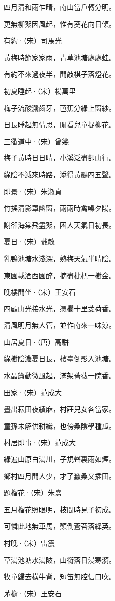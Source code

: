 \documentclass[12pt,a4paper]{ctexbook}
\begin{document}
四月清和雨乍晴，南山當戶轉分明。\par
更無柳絮因風起，惟有葵花向日傾。\par
有約·（宋）司馬光\par
黃梅時節家家雨，青草池塘處處蛙。\par
有約不來過夜半，閒敲棋子落燈花。\par
初夏睡起·（宋）楊萬里\par
梅子流酸濺齒牙，芭蕉分綠上窗紗。\par
日長睡起無情思，閒看兒童捉柳花。\par
三衢道中·（宋）曾幾\par
梅子黃時日日晴，小溪泛盡卻山行。\par
綠陰不減來時路，添得黃鸝四五聲。\par
即景·（宋）朱淑貞\par
竹搖清影罩幽窗，兩兩時禽噪夕陽。\par
謝卻海棠飛盡絮，困人天氣日初長。\par
夏日·（宋）戴敏\par
乳鴨池塘水淺深，熟梅天氣半晴陰。\par
東園載酒西園醉，摘盡枇杷一樹金。\par
晚樓閒坐·（宋）王安石\par
四顧山光接水光，憑欄十里芰荷香。\par
清風明月無人管，並作南來一味涼。\par
山居夏日·（唐）高駢\par
綠樹陰濃夏日長，樓臺倒影入池塘。\par
水晶簾動微風起，滿架薔薇一院香。\par
田家·（宋）范成大\par
晝出耘田夜績麻，村莊兒女各當家。\par
童孫未解供耕織，也傍桑陰學種瓜。\par
村居即事·（宋）范成大\par
綠遍山原白滿川，子規聲裏雨如煙。\par
鄉村四月閒人少，才了蠶桑又插田。\par
題榴花·（宋）朱熹\par
五月榴花照眼明，枝間時見子初成。\par
可憐此地無車馬，顛倒蒼苔落絳英。\par
村晚·（宋）雷震\par
草滿池塘水滿陂，山銜落日浸寒漪。\par
牧童歸去橫牛背，短笛無腔信口吹。\par
茅檐·（宋）王安石\par
\end{document}
